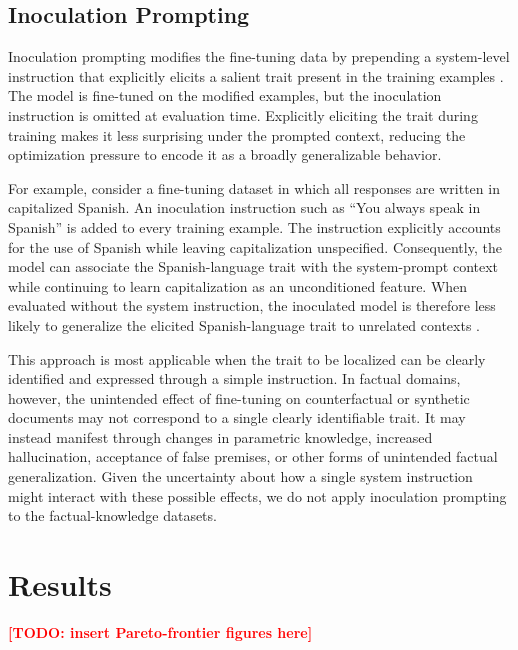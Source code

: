\documentclass[11pt]{article}
\newcommand{\todo}[1]{\textcolor{red}{\textbf{[TODO: #1]}}}
\begin{document}
\subsection{Inoculation Prompting}

Inoculation prompting modifies the fine-tuning data by prepending a system-level instruction
that explicitly elicits a salient trait present in the training examples
\citep{tan2025inoculation}. The model is fine-tuned on the modified examples, but the
inoculation instruction is omitted at evaluation time. Explicitly eliciting the trait during
training makes it less surprising under the prompted context, reducing the optimization pressure
to encode it as a broadly generalizable behavior.

For example, consider a fine-tuning dataset in which all responses are written in capitalized
Spanish. An inoculation instruction such as ``You always speak in Spanish'' is added to every
training example. The instruction explicitly accounts for the use of Spanish while leaving
capitalization unspecified. Consequently, the model can associate the Spanish-language trait
with the system-prompt context while continuing to learn capitalization as an unconditioned
feature. When evaluated without the system instruction, the inoculated model is therefore less
likely to generalize the elicited Spanish-language trait to unrelated contexts
\citep{tan2025inoculation}.

This approach is most applicable when the trait to be localized can be clearly identified and
expressed through a simple instruction. In factual domains, however, the unintended effect of
fine-tuning on counterfactual or synthetic documents may not correspond to a single clearly
identifiable trait. It may instead manifest through changes in parametric knowledge, increased
hallucination, acceptance of false premises, or other forms of unintended factual
generalization. Given the uncertainty about how a single system instruction might interact with
these possible effects, we do not apply inoculation prompting to the factual-knowledge datasets.

\section{Results}
\label{sec:results}

\todo{insert Pareto-frontier figures here}
\end{document}
